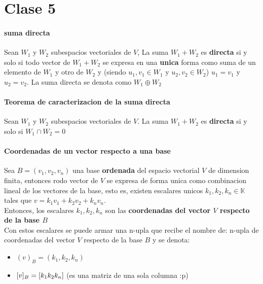 \documentclass[10pt]{article}
\begin{document}
\section{Clase 5}

\paragraph{suma directa}

Sean $W_1$ y $W_2$ subespacios vectoriales de $V$, La suma $W_1 + W_2$ es \textbf{directa} si y solo si todo vector de $W_1 + W_2$ se expresa en una \textbf{unica} forma como suma de un elemento de $W_1$ y otro de $W_2$ y (siendo $u_1, v_1 \in W_1$ y $u_2, v_2 \in W_2$) $u_1 = v_1$ y $u_2 = v_2$. La suma directa se denota como $W_1 \oplus W_2$

\paragraph{Teorema de caracterizacion de la suma directa}

Sean $W_1$ y $W_2$ subespacios vectoriales de $V$. La suma $W_1 + W_2$ es \textbf{directa} si y solo si $W_1 \cap W_2 = {0}$ 

\paragraph{Coordenadas de un vector respecto a una base}

Sea $B = (v_1, v_2, v_n)$ una base \textbf{ordenada} del espacio vectorial $V$ de dimension finita, entonces rodo vector de $V$ se expresa de forma unica como combinacion lineal de los vectores de la base, esto es, existen escalares unicos $k_1, k_2, k_n \in  \mathbb{K}$ tales que $v = k_1 v_1 + k_2 v_2 + k_n v_n$.\\
\linebreak
Entonces, los escalares $k_1, k_2, k_n$ son las \textbf{coordenadas del vector $V$ respecto de la base $B$}\\
\linebreak
Con estos escalares se puede armar una n-upla que recibe el nombre de: n-upla de coordenadas del vector $V$ respecto de la base $B$ y se denota:
\begin{itemize}
	\item $(v)_B = (k_1, k_2, k_n)$
	\item $[v]_B = \left[ k_1\\ k_2\\k_n  \right]$ (es una matriz de una sola columna :p)
\end{itemize}
\end{document}
